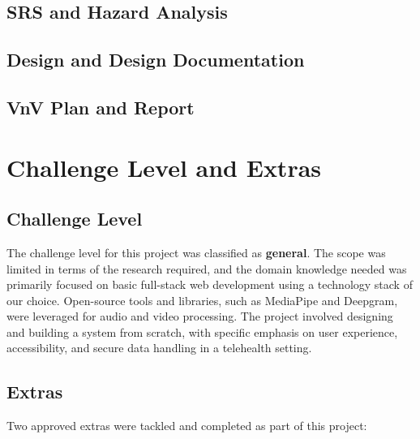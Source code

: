 \documentclass{article}
\begin{document}

\subsection{SRS and Hazard Analysis}

\subsection{Design and Design Documentation}

\subsection{VnV Plan and Report}

\section{Challenge Level and Extras}

\subsection{Challenge Level}

The challenge level for this project was classified as \textbf{general}. The scope was limited in terms of the research required, and the domain knowledge needed was primarily focused on basic full-stack web development using a technology stack of our choice. 
Open-source tools and libraries, such as MediaPipe and Deepgram, were leveraged for audio and video processing. The project involved designing and building a system from scratch, with specific emphasis on user experience, accessibility, and secure data handling in a telehealth setting.

\subsection{Extras}

Two approved extras were tackled and completed as part of this project:
\end{document}
